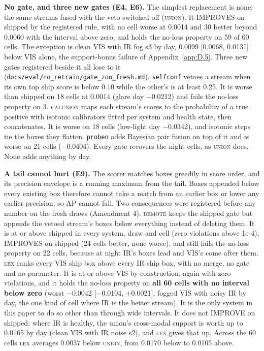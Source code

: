 \documentclass[journal,onecolumn]{IEEEtran}
\begin{document}
\textbf{No gate, and three new gates (E4, E6).} The simplest replacement is none: the same streams fused with the veto switched off (\textsc{union}). It IMPROVES on shipped by the registered rule, with no cell worse at 0.0014 and 30 better beyond 0.0060 with the interval above zero, and holds the no-loss property on 59 of 60 cells. The exception is clean VIS with IR fog s3 by day, 0.0099 [0.0068, 0.0131] below VIS alone, the support-bonus failure of Appendix~\ref{app:D.5}. Three new gates registered beside it all lose to it (\texttt{docs/\allowbreak{}eval/\allowbreak{}no\_\allowbreak{}retrain/\allowbreak{}gate\_\allowbreak{}zoo\_\allowbreak{}fresh.md}). \texttt{selfconf} vetoes a stream when its own top ship score is below 0.10 while the other's is at least 0.25. It is worse than shipped on 18 cells at 0.0014 (glare day $-$0.0212) and fails the no-loss property on 3. \textsc{calunion} maps each stream's scores to the probability of a true positive with isotonic calibrators fitted per system and health state, then concatenates. It is worse on 18 cells (low-light day $-$0.0342), and isotonic steps tie the boxes they flatten. \texttt{proben} adds Bayesian pair fusion \cite{chen2022multimodal} on top of it and is worse on 21 cells ($-$0.0404). Every gate recovers the night cells, as \textsc{union} does. None adds anything by day.

\textbf{A tail cannot hurt (E9).} The scorer matches boxes greedily in score order, and its precision envelope is a running maximum from the tail. Boxes appended below every existing box therefore cannot take a match from an earlier box or lower any earlier precision, so AP cannot fall. Two consequences were registered before any number on the fresh draws (Amendment 4). \textsc{demote} keeps the shipped gate but appends the vetoed stream's boxes below everything instead of deleting them. It is at or above shipped in every system, draw and cell (zero violations above 1e-4), IMPROVES on shipped (24 cells better, none worse), and still fails the no-loss property on 22 cells, because at night IR's boxes lead and VIS's come after them. \textsc{lex} ranks every VIS ship box above every IR ship box, with no merge, no gate and no parameter. It is at or above VIS by construction, again with zero violations, and it holds the no-loss property on \textbf{all 60 cells with no interval below zero} (worst $-$0.0042 [$-$0.0104, +0.0021], fogged VIS with noisy IR by day, the one kind of cell where IR is the better stream). It is the only system in this paper to do so other than through wide intervals. It does not IMPROVE on shipped: where IR is healthy, the union's cross-modal support is worth up to 0.0165 by day (clean VIS with IR noise s2), and \textsc{lex} gives that up. Across the 60 cells \textsc{lex} averages 0.0037 below \textsc{union}, from 0.0170 below to 0.0105 above.
\end{document}
